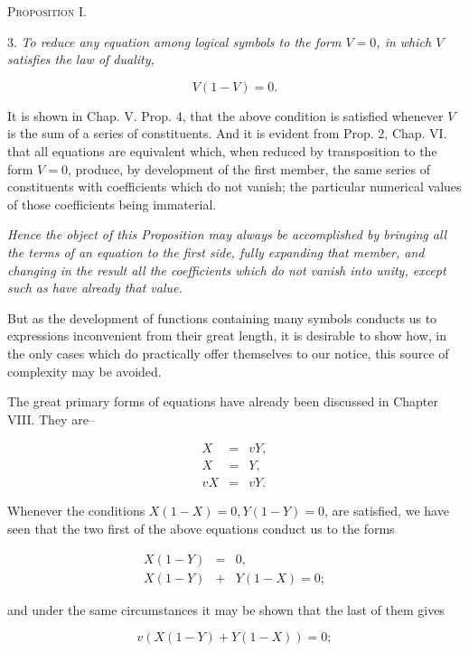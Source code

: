\documentclass[oneside]{book}
\begin{document}
\begin{center}
\textsc{Proposition I.}
\end{center}

3. \textit{To reduce any equation among logical symbols to the form
$V=0$, in which $V$ satisfies the law of duality,}

\[
V(1 - V) = 0.
\]

It is shown in Chap. V. Prop. 4, that the above condition is
satisfied whenever $V$ is the sum of a series of constituents. And
it is evident from Prop. 2, Chap. VI. that all equations are equivalent
which, when reduced by transposition to the form $V=0$,
produce, by development of the first member, the same series of
constituents with coefficients which do not vanish; the particular
numerical values of those coefficients being immaterial.

\textit{Hence the object of this Proposition may always be accomplished
by bringing all the terms of an equation to the first side,
fully expanding that member, and changing in the result all the coefficients
which do not vanish into unity, except such as have already
that value.}

But as the development of functions containing many symbols
conducts us to expressions inconvenient from their great
length, it is desirable to show how, in the only cases which do
practically offer themselves to our notice, this source of
complexity may be avoided.

The great primary forms of equations have already been discussed
in Chapter VIII. They are--

\begin{eqnarray*}
X &=& vY, \\
X &=& Y, \\
vX &=& vY.
\end{eqnarray*}

Whenever the conditions $X(1-X) = 0, Y(1-Y) = 0$, are
satisfied, we have seen that the two first of the above equations
conduct us to the forms

\begin{eqnarray}
X(1-Y) &=& 0,\\
X(1-Y) &+& Y(1-X) = 0;
\end{eqnarray}

and under the same circumstances it may be shown that the last
of them gives

\begin{equation}
v( X(1-Y) + Y(1-X) ) = 0;
\end{equation}
\end{document}
